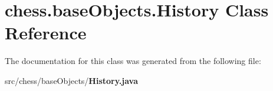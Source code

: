 \section{chess.\+base\+Objects.\+History Class Reference}
\label{classchess_1_1base_objects_1_1_history}


The documentation for this class was generated from the following file\+:\begin{DoxyCompactItemize}
\item 
src/chess/base\+Objects/{\bf History.\+java}\end{DoxyCompactItemize}
